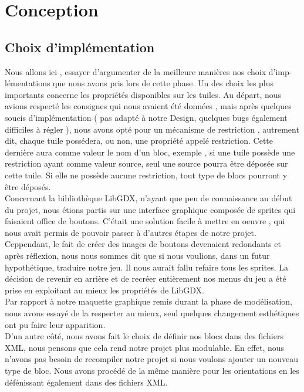 \documentclass[a4paper,10pt]{article}
\begin{document}
\section{Conception}
\subsection{Choix d'implémentation}
Nous allons ici , essayer d'argumenter de la meilleure manières nos choix d'imp-\\lémentations que nous avons pris lors de cette phase.
Un des choix les plus importants concerne les propriétés disponibles sur les tuiles. Au départ, nous avions respecté les consignes qui nous
avaient été données , mais après quelques soucis d'implémentation ( pas adapté à notre Design, quelques bugs également difficiles à régler ), nous
avons opté pour un mécanisme de restriction , autrement dit, chaque tuile possédera, ou non, une propriété appelé restriction. Cette dernière aura
comme valeur le nom d'un bloc, exemple , si une tuile possède une restriction ayant comme valeur source, seul une source pourra être déposée sur cette tuile.
Si elle ne possède aucune restriction, tout type de blocs pourront y être déposés. 
\\
Concernant la bibliothèque LibGDX, n'ayant que peu de connaissance au début du projet, nous étions partis sur une interface graphique composée de sprites qui faisaient
office de boutons. C'était une solution facile à mettre en oeuvre , qui nous avait permis de pouvoir passer à d'autres étapes de notre projet.\\
Ceppendant, le fait de créer des images de boutons devenaient redondants et après réflexion, nous nous sommes dit que si nous voulions, dans un futur
hypothétique, traduire notre jeu. Il nous aurait fallu refaire tous les sprites. La décision de revenir en arrière et de recréer entièrement nos menus 
du jeu a été prise en exploitant au mieux les propriétés de LibGDX. 
\\
Par rapport à notre maquette graphique remis durant la phase de modélisation, nous avons essayé de la respecter au mieux, seul quelques changement
esthétiques ont pu faire leur apparition.
\\
D'un autre côté, nous avons fait le choix de définir nos blocs dans des fichiers XML, nous pensons que cela rend notre projet plus modulable. En effet, nous 
n'avons pas besoin de recompiler notre projet si nous voulons ajouter un nouveau type de bloc. Nous avons procédé de la même manière pour les orientations
en les défénissant également dans des fichiers XML.
\end{document}
